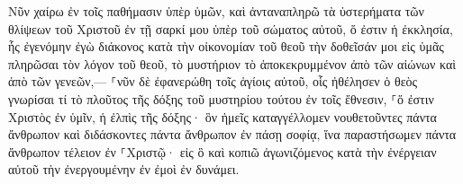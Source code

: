 \documentclass{openreader}
\begin{document}
Νῦν χαίρω ἐν τοῖς παθήμασιν ὑπὲρ ὑμῶν, καὶ ἀνταναπληρῶ τὰ ὑστερήματα τῶν θλίψεων τοῦ Χριστοῦ ἐν τῇ σαρκί μου ὑπὲρ τοῦ σώματος αὐτοῦ, ὅ ἐστιν ἡ ἐκκλησία, 
ἧς ἐγενόμην ἐγὼ διάκονος κατὰ τὴν οἰκονομίαν τοῦ θεοῦ τὴν δοθεῖσάν μοι εἰς ὑμᾶς πληρῶσαι τὸν λόγον τοῦ θεοῦ, 
τὸ μυστήριον τὸ ἀποκεκρυμμένον ἀπὸ τῶν αἰώνων καὶ ἀπὸ τῶν γενεῶν,— ⸀νῦν δὲ ἐφανερώθη τοῖς ἁγίοις αὐτοῦ, 
οἷς ἠθέλησεν ὁ θεὸς γνωρίσαι τί τὸ πλοῦτος τῆς δόξης τοῦ μυστηρίου τούτου ἐν τοῖς ἔθνεσιν, ⸀ὅ ἐστιν Χριστὸς ἐν ὑμῖν, ἡ ἐλπὶς τῆς δόξης· 
ὃν ἡμεῖς καταγγέλλομεν νουθετοῦντες πάντα ἄνθρωπον καὶ διδάσκοντες πάντα ἄνθρωπον ἐν πάσῃ σοφίᾳ, ἵνα παραστήσωμεν πάντα ἄνθρωπον τέλειον ἐν ⸀Χριστῷ· 
εἰς ὃ καὶ κοπιῶ ἀγωνιζόμενος κατὰ τὴν ἐνέργειαν αὐτοῦ τὴν ἐνεργουμένην ἐν ἐμοὶ ἐν δυνάμει. 
\end{document}
